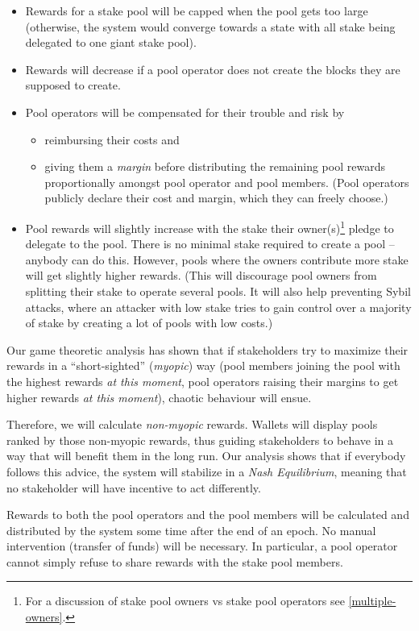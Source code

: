 \documentclass[11pt,a4paper]{article}
\begin{document}
\begin{itemize}
\item
  Rewards for a stake pool will be capped when the pool gets too large
  (otherwise, the system would converge towards a state with all stake
  being delegated to one giant stake pool).
\item
  Rewards will decrease if a pool operator does not create the blocks they
  are supposed to create.
\item
  Pool operators will be compensated for their trouble and risk by
  \begin{itemize}
  \item
    reimbursing their costs and
  \item
    giving them a \emph{margin} before distributing the remaining pool rewards
    proportionally amongst pool operator and pool members. (Pool operators
    publicly declare their cost and margin, which they can freely choose.)
  \end{itemize}
\item
  Pool rewards will slightly increase with the stake their owner(s)\footnote{For
    a discussion of stake pool owners vs stake pool operators see
    \cref{multiple-owners}.} pledge to delegate to the pool. There is no minimal
  stake required to create a pool -- anybody can do this. However, pools where
  the owners contribute more stake will get slightly higher rewards. (This will
  discourage pool owners from splitting their stake to operate several pools. It
  will also help preventing Sybil attacks, where an attacker with low stake
  tries to gain control over a majority of stake by creating a lot of pools with
  low costs.)
\end{itemize}

Our game theoretic analysis has shown that if stakeholders try to
maximize their rewards in a ``short-sighted'' (\emph{myopic}) way (pool
members joining the pool with the highest rewards \emph{at this moment},
pool operators raising their margins to get higher rewards \emph{at this
moment}), chaotic behaviour will ensue.

Therefore, we will calculate \emph{non-myopic} rewards. Wallets will display
pools ranked by those non-myopic rewards, thus guiding stakeholders to behave in
a way that will benefit them in the long run. Our analysis shows that if
everybody follows this advice, the system will stabilize in a \emph{Nash
  Equilibrium}, meaning that no stakeholder will have incentive to act
differently.

Rewards to both the pool operators and the pool members will be calculated and
distributed by the system some time after the end of an epoch. No manual
intervention (transfer of funds) will be necessary. In particular, a pool
operator cannot simply refuse to share rewards with the stake pool members.
\end{document}
